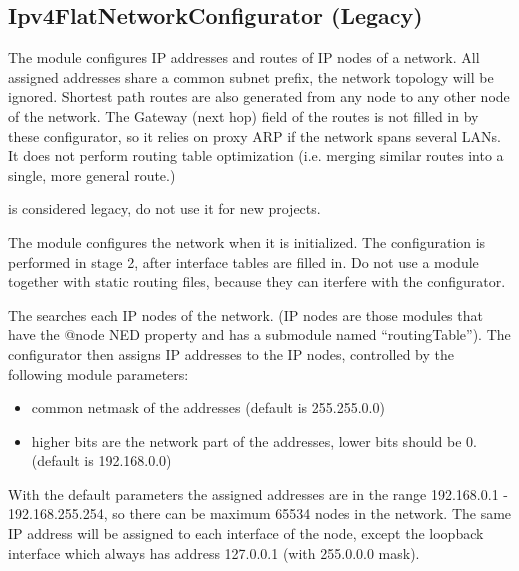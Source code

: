 \subsection{Ipv4FlatNetworkConfigurator (Legacy)}
\label{sec:autoconfig:ipv4flatnetworkconfigurator}

The  module configures
IP addresses and routes of IP nodes of a network.
All assigned addresses share a common subnet prefix,
the network topology will be ignored. Shortest path
routes are also generated from any node to any other
node of the network. The Gateway (next hop) field of the routes
is not filled in by these configurator, so it relies
on proxy ARP if the network spans several LANs.
It does not perform routing table optimization (i.e.
merging similar routes into a single, more general route.)

\begin{warning}
 is considered
legacy, do not use it for new projects.
\end{warning}

The  module configures
the network when it is initialized. The configuration
is performed in stage 2, after interface tables are
filled in. Do not use a 
module together with static routing files, because they
can iterfere with the configurator.

The  searches each IP nodes of the network.
(IP nodes are those modules that have the @node NED property and
has a  submodule named ``routingTable'').
The configurator then assigns IP addresses to the IP nodes, controlled
by the following module parameters:
\begin{itemize}
  \item {} common netmask of the addresses (default is 255.255.0.0)
  \item {} higher bits are the network part of the addresses,
        lower bits should be 0. (default is 192.168.0.0)
\end{itemize}

With the default parameters the assigned addresses are in the range
192.168.0.1 - 192.168.255.254, so there can be maximum 65534 nodes in the
network. The same IP address will be assigned to each interface
of the node, except the loopback interface which always has address 127.0.0.1
(with 255.0.0.0 mask).

